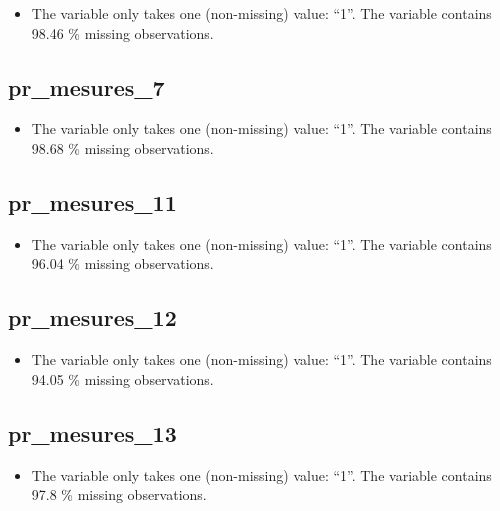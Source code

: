 \documentclass[
  letterpaper,
  DIV=11,
  numbers=noendperiod]{scrartcl}
\providecommand{\tightlist}{%
  \setlength{\itemsep}{0pt}\setlength{\parskip}{0pt}}
\begin{document}
\begin{itemize}
\tightlist
\item
  The variable only takes one (non-missing) value: ``1''. The variable
  contains 98.46 \% missing observations.
\end{itemize}

\fullline

\subsection{pr\_mesures\_7}\label{pr_mesures_7}

\begin{itemize}
\tightlist
\item
  The variable only takes one (non-missing) value: ``1''. The variable
  contains 98.68 \% missing observations.
\end{itemize}

\fullline

\subsection{pr\_mesures\_11}\label{pr_mesures_11}

\begin{itemize}
\tightlist
\item
  The variable only takes one (non-missing) value: ``1''. The variable
  contains 96.04 \% missing observations.
\end{itemize}

\fullline

\subsection{pr\_mesures\_12}\label{pr_mesures_12}

\begin{itemize}
\tightlist
\item
  The variable only takes one (non-missing) value: ``1''. The variable
  contains 94.05 \% missing observations.
\end{itemize}

\fullline

\subsection{pr\_mesures\_13}\label{pr_mesures_13}

\begin{itemize}
\tightlist
\item
  The variable only takes one (non-missing) value: ``1''. The variable
  contains 97.8 \% missing observations.
\end{itemize}
\end{document}
